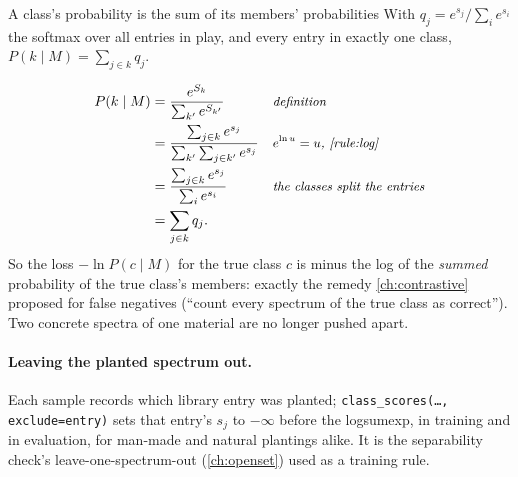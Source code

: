 \documentclass[11pt,a4paper,oneside,openany]{book}
\newcommand{\why}[1]{&&\text{\small\itshape #1}}
\begin{document}
\begin{rulebox}[label=rule:classsum]{A class's probability is the sum of its members' probabilities}
With $q_j=e^{s_j}/\sum_ie^{s_i}$ the softmax over all entries in play, and every entry in exactly one class, $P(k\mid M)=\sum_{j\in k}q_j$.
\end{rulebox}
\begin{align*}
P(k\mid M) &= \frac{e^{S_k}}{\sum_{k'}e^{S_{k'}}} \why{definition}\\
&= \frac{\sum_{j\in k}e^{s_j}}{\sum_{k'}\sum_{j\in k'}e^{s_j}} \why{$e^{\ln u}=u$, \cref{rule:log}}\\
&= \frac{\sum_{j\in k}e^{s_j}}{\sum_i e^{s_i}} \why{the classes split the entries}\\
&= \sum_{j\in k}q_j .
\end{align*}
So the loss $-\ln P(c\mid M)$ for the true class $c$ is minus the log of the \emph{summed} probability of the true class's members: exactly the remedy \cref{ch:contrastive}
proposed for false negatives (``count every spectrum of the true class as correct''). Two concrete spectra of one material are no longer pushed apart.

\paragraph{Leaving the planted spectrum out.} Each sample records which library entry was planted; \texttt{class\_scores(\dots, exclude=entry)} sets that entry's $s_j$ to
$-\infty$ before the logsumexp, in training and in evaluation, for man-made and natural plantings alike. It is the separability check's leave-one-spectrum-out
(\cref{ch:openset}) used as a training rule.
\end{document}
